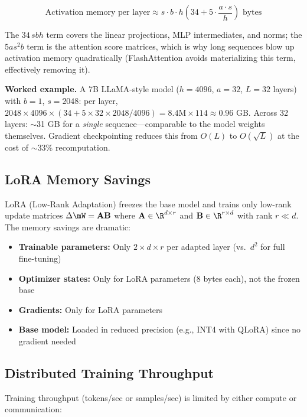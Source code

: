 \begin{equation}
\text{Activation memory per layer} \approx s \cdot b \cdot h \left(34 + 5 \cdot \frac{a \cdot s}{h}\right) \text{ bytes}
\end{equation}

The $34\,sbh$ term covers the linear projections, MLP intermediates, and norms; the $5as^2b$ term is the attention score matrices, which is why long sequences blow up activation memory quadratically (FlashAttention avoids materializing this term, effectively removing it).

\textbf{Worked example.} A 7B LLaMA-style model ($h = 4096$, $a = 32$, $L = 32$ layers) with $b = 1$, $s = 2048$: per layer, $2048 \times 4096 \times (34 + 5 \times 32 \times 2048 / 4096) = 8.4\text{M} \times 114 \approx 0.96$ GB. Across 32 layers: $\sim$31 GB for a \textit{single} sequence---comparable to the model weights themselves. Gradient checkpointing reduces this from $O(L)$ to $O(\sqrt{L})$ at the cost of $\sim$33\% recomputation.

\subsection{LoRA Memory Savings}

LoRA (Low-Rank Adaptation) freezes the base model and trains only low-rank update matrices $\Delta \mW = \mathbf{A}\mathbf{B}$ where $\mathbf{A} \in \R^{d \times r}$ and $\mathbf{B} \in \R^{r \times d}$ with rank $r \ll d$. The memory savings are dramatic:

\begin{itemize}
    \item \textbf{Trainable parameters:} Only $2 \times d \times r$ per adapted layer (vs.\ $d^2$ for full fine-tuning)
    \item \textbf{Optimizer states:} Only for LoRA parameters (8 bytes each), not the frozen base
    \item \textbf{Gradients:} Only for LoRA parameters
    \item \textbf{Base model:} Loaded in reduced precision (e.g., INT4 with QLoRA) since no gradient needed
\end{itemize}

\subsection{Distributed Training Throughput}

Training throughput (tokens/sec or samples/sec) is limited by either compute or communication:

